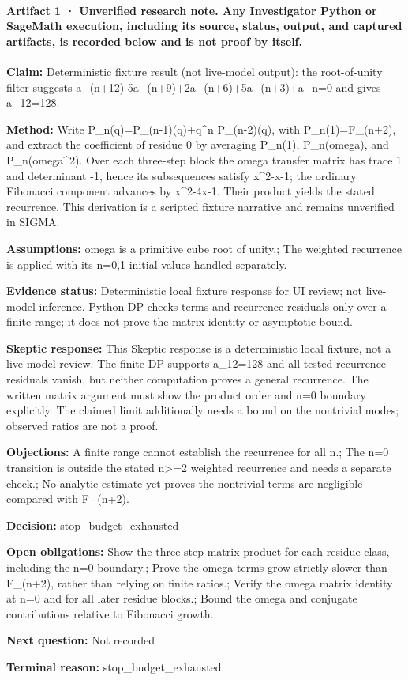 \documentclass[11pt]{article}
\begin{document}
\paragraph{Artifact 1 · Unverified research note. Any Investigator Python or SageMath execution, including its source, status, output, and captured artifacts, is recorded below and is not proof by itself.}
\textbf{Claim:} Deterministic fixture result (not live-model output): the root-of-unity filter suggests a\_(n+12)-5a\_(n+9)+2a\_(n+6)+5a\_(n+3)+a\_n=0 and gives a\_12=128.\par
\textbf{Method:} Write P\_n(q)=P\_(n-1)(q)+q\textasciicircum{}n P\_(n-2)(q), with P\_n(1)=F\_(n+2), and extract the coefficient of residue 0 by averaging P\_n(1), P\_n(omega), and P\_n(omega\textasciicircum{}2). Over each three-step block the omega transfer matrix has trace 1 and determinant -1, hence its subsequences satisfy x\textasciicircum{}2-x-1; the ordinary Fibonacci component advances by x\textasciicircum{}2-4x-1. Their product yields the stated recurrence. This derivation is a scripted fixture narrative and remains unverified in SIGMA.\par
\textbf{Assumptions:} omega is a primitive cube root of unity.; The weighted recurrence is applied with its n=0,1 initial values handled separately.\par
\textbf{Evidence status:} Deterministic local fixture response for UI review; not live-model inference. Python DP checks terms and recurrence residuals only over a finite range; it does not prove the matrix identity or asymptotic bound.\par
\textbf{Skeptic response:} This Skeptic response is a deterministic local fixture, not a live-model review. The finite DP supports a\_12=128 and all tested recurrence residuals vanish, but neither computation proves a general recurrence. The written matrix argument must show the product order and n=0 boundary explicitly. The claimed limit additionally needs a bound on the nontrivial modes; observed ratios are not a proof.\par
\textbf{Objections:} A finite range cannot establish the recurrence for all n.; The n=0 transition is outside the stated n\textgreater{}=2 weighted recurrence and needs a separate check.; No analytic estimate yet proves the nontrivial terms are negligible compared with F\_(n+2).\par
\textbf{Decision:} stop\_budget\_exhausted\par
\textbf{Open obligations:} Show the three-step matrix product for each residue class, including the n=0 boundary.; Prove the omega terms grow strictly slower than F\_(n+2), rather than relying on finite ratios.; Verify the omega matrix identity at n=0 and for all later residue blocks.; Bound the omega and conjugate contributions relative to Fibonacci growth.\par
\textbf{Next question:} Not recorded\par
\textbf{Terminal reason:} stop\_budget\_exhausted\par
\end{document}

